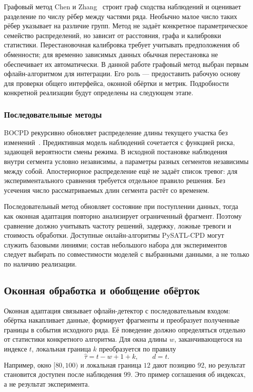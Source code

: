 Графовый метод Chen и Zhang~\cite{chen2015} строит граф сходства
наблюдений и оценивает разделение по числу рёбер между частями ряда.
Необычно малое число таких рёбер указывает на различие групп.
Метод не задаёт конкретное параметрическое семейство распределений,
но зависит от расстояния, графа и калибровки статистики.
Перестановочная калибровка требует учитывать предположения
об обменности; для временно зависимых данных обычная перестановка
не обеспечивает их автоматически. В данной работе графовый метод
выбран первым офлайн-алгоритмом для интеграции. Его роль ---
предоставить рабочую основу для проверки общего интерфейса,
оконной обёртки и метрик. Подробности конкретной реализации
будут определены на следующем этапе.

\subsubsection{Последовательные методы}

BOCPD рекурсивно обновляет распределение длины текущего участка
без изменений~\cite{adams2007}. Предиктивная модель наблюдений
сочетается с функцией риска, задающей вероятности смены режима.
В исходной постановке наблюдения внутри сегмента условно независимы,
а параметры разных сегментов независимы между собой.
Апостериорное распределение ещё не задаёт список тревог:
для экспериментального сравнения требуется отдельное правило решения.
Без усечения число рассматриваемых длин сегмента растёт со временем.

Последовательный метод обновляет состояние при поступлении данных,
тогда как оконная адаптация повторно анализирует ограниченный фрагмент.
Поэтому сравнение должно учитывать частоту решений, задержку,
ложные тревоги и стоимость обработки. Доступные онлайн-алгоритмы
PySATL-CPD могут служить базовыми линиями; состав небольшого набора
для экспериментов следует выбирать по совместимости моделей
с выбранными данными, а не только по наличию реализации.

\subsection{Оконная обработка и обобщение обёрток}

Оконная адаптация связывает офлайн-детектор с последовательным входом:
обёртка накапливает данные, формирует фрагменты и преобразует
полученные границы в события исходного ряда. Её поведение должно
определяться отдельно от статистики конкретного алгоритма.
Для окна длины $w$, заканчивающегося на индексе $t$, локальная
граница $k$ преобразуется по правилу
\[
 \hat\tau=t-w+1+k,\qquad d=t.
\]
Например, окно $[80,100)$ и локальная граница $12$ дают позицию $92$,
но результат становится доступен после наблюдения $99$.
Это пример соглашения об индексах, а не результат эксперимента.


